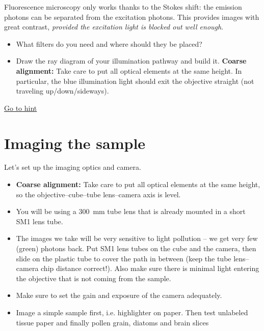 \documentclass[a4paper]{report}
\begin{document}
    Fluorescence microscopy only works thanks to the Stokes shift: the emission photons can be separated from the excitation photons. This provides images with great contrast, \emph{provided the excitation light is blocked out well enough}.
    \begin{itemize}
	    \item What filters do you need and where should they be placed?
	    \item Draw the ray diagram of your illumination pathway and build it. \textbf{Coarse alignment:} Take care to put all optical elements at the same height. In particular, the blue illumination light should exit the objective straight (not traveling up/down/sideways).
	\end{itemize}
	
	\hyperlink{hintTo-illumination}{Go to hint}
	\\
	
	
	\section{Imaging the sample}
	Let's set up the imaging optics and camera.
    \begin{itemize}
        \item \textbf{Coarse alignment:} Take care to put all optical elements at the same height, so the objective--cube--tube lens--camera axis is level.
        \item You will be using a 300~mm tube lens that is already mounted in a short SM1 lens tube. 
        \item The images we take will be very sensitive to light pollution -- we get very few (green) photons back. Put SM1 lens tubes on the cube and the camera, then slide on the plastic tube to cover the path in between (keep the tube lens--camera chip distance correct!). Also make sure there is minimal light entering the objective that is not coming from the sample.
        \item Make sure to set the gain and exposure of the camera adequately.
        \item Image a simple sample first, i.e. highlighter on paper. Then test unlabeled tissue paper and finally pollen grain, diatoms and brain slices
        
    \end{itemize}
	\hypertarget{hintBack-imaging}{}
	
\end{document}
